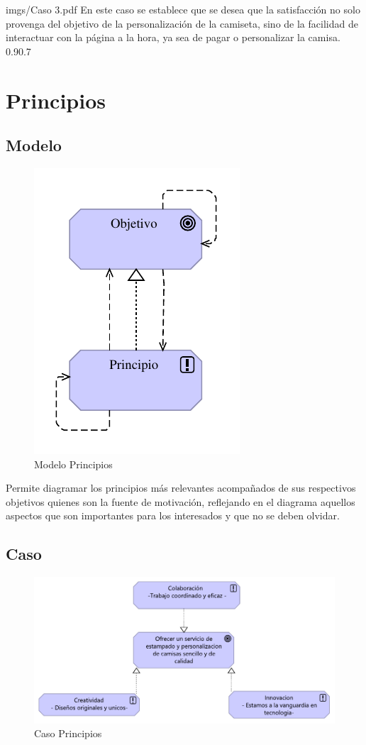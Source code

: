 {imgs/Caso 3.pdf}
{
En este caso se establece que se desea que la satisfacción no solo provenga del objetivo de la personalización de la camiseta, sino de la facilidad de interactuar con la página a la hora, ya sea de pagar o personalizar la camisa.
}{0.9}{0.7}


\newpage
\section{Principios}
\subsection{Modelo}
\begin{figure}[H]
	\centering	
    \includegraphics[width=0.3\linewidth]{imgs/Modelo 4.pdf}
	\caption{Modelo Principios}
\end{figure}
 Permite diagramar los principios más relevantes acompañados de sus respectivos objetivos quienes son la fuente de motivación, reflejando en el diagrama aquellos aspectos que son importantes para los interesados y que no se deben olvidar.
\subsection{Caso}
\begin{figure}[H]
	\centering	
    \includegraphics[width=0.9\linewidth]{imgs/Caso 4.pdf}
	\caption{Caso Principios}	
 \end{figure}

